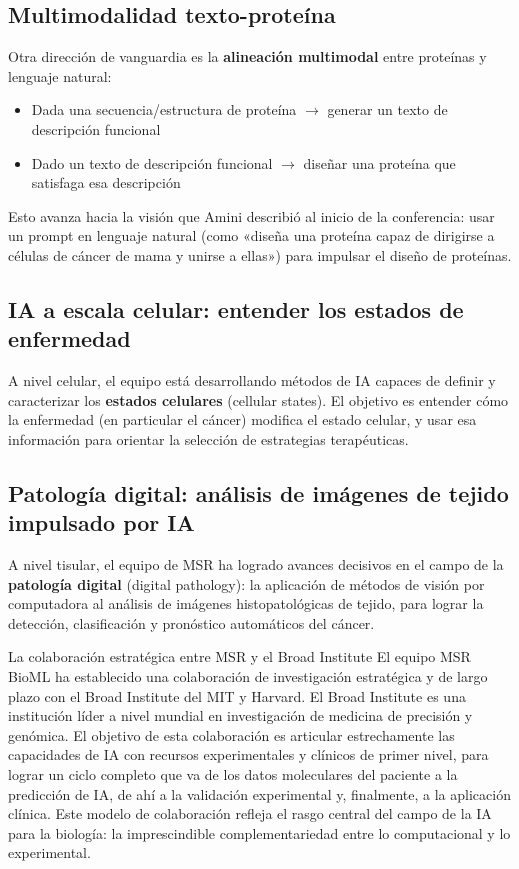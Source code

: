 \documentclass[a4paper]{article}
\begin{document}
\subsection{Multimodalidad texto-proteína}

Otra dirección de vanguardia es la \textbf{alineación multimodal} entre proteínas y lenguaje natural:

\begin{itemize}
    \item Dada una secuencia/estructura de proteína $\rightarrow$ generar un texto de descripción funcional
    \item Dado un texto de descripción funcional $\rightarrow$ diseñar una proteína que satisfaga esa descripción
\end{itemize}

Esto avanza hacia la visión que Amini describió al inicio de la conferencia: usar un prompt en lenguaje natural (como «diseña una proteína capaz de dirigirse a células de cáncer de mama y unirse a ellas») para impulsar el diseño de proteínas.

\subsection{IA a escala celular: entender los estados de enfermedad}

A nivel celular, el equipo está desarrollando métodos de IA capaces de definir y caracterizar los \textbf{estados celulares} (cellular states). El objetivo es entender cómo la enfermedad (en particular el cáncer) modifica el estado celular, y usar esa información para orientar la selección de estrategias terapéuticas.

\subsection{Patología digital: análisis de imágenes de tejido impulsado por IA}

A nivel tisular, el equipo de MSR ha logrado avances decisivos en el campo de la \textbf{patología digital} (digital pathology): la aplicación de métodos de visión por computadora al análisis de imágenes histopatológicas de tejido, para lograr la detección, clasificación y pronóstico automáticos del cáncer.

\begin{knowledgebox}{La colaboración estratégica entre MSR y el Broad Institute}
El equipo MSR BioML ha establecido una colaboración de investigación estratégica y de largo plazo con el Broad Institute del MIT y Harvard. El Broad Institute es una institución líder a nivel mundial en investigación de medicina de precisión y genómica. El objetivo de esta colaboración es articular estrechamente las capacidades de IA con recursos experimentales y clínicos de primer nivel, para lograr un ciclo completo que va de los datos moleculares del paciente a la predicción de IA, de ahí a la validación experimental y, finalmente, a la aplicación clínica. Este modelo de colaboración refleja el rasgo central del campo de la IA para la biología: la imprescindible complementariedad entre lo computacional y lo experimental.
\end{knowledgebox}
\end{document}
